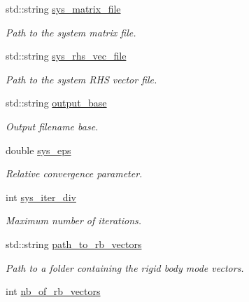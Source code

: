 \begin{DoxyCompactItemize}
\item 
std\+::string \hyperlink{structcarl_1_1libmesh__solve__linear__system__input__params_a2a39165021ba68bc91c857d860539c34}{sys\+\_\+matrix\+\_\+file}
\begin{DoxyCompactList}\small\item\em Path to the system matrix file. \end{DoxyCompactList}\item 
std\+::string \hyperlink{structcarl_1_1libmesh__solve__linear__system__input__params_ab61ffd0ba104883487ed36c6b5ce9e70}{sys\+\_\+rhs\+\_\+vec\+\_\+file}
\begin{DoxyCompactList}\small\item\em Path to the system R\+H\+S vector file. \end{DoxyCompactList}\item 
std\+::string \hyperlink{structcarl_1_1libmesh__solve__linear__system__input__params_a8ef071dca667af6aeafc942ff15df7ad}{output\+\_\+base}
\begin{DoxyCompactList}\small\item\em Output filename base. \end{DoxyCompactList}\item 
double \hyperlink{structcarl_1_1libmesh__solve__linear__system__input__params_aac011ff9dbbc01b0177480e9cdadb5b8}{sys\+\_\+eps}
\begin{DoxyCompactList}\small\item\em Relative convergence parameter. \end{DoxyCompactList}\item 
int \hyperlink{structcarl_1_1libmesh__solve__linear__system__input__params_afead959622d671c5b5ee1200c2e43dad}{sys\+\_\+iter\+\_\+div}
\begin{DoxyCompactList}\small\item\em Maximum number of iterations. \end{DoxyCompactList}\item 
std\+::string \hyperlink{structcarl_1_1libmesh__solve__linear__system__input__params_ab1c0d1c19d1849c0b32e0a1d95d11bff}{path\+\_\+to\+\_\+rb\+\_\+vectors}
\begin{DoxyCompactList}\small\item\em Path to a folder containing the rigid body mode vectors. \end{DoxyCompactList}\item 
int \hyperlink{structcarl_1_1libmesh__solve__linear__system__input__params_abe24bbe9e6a211c17bbb0d2f58d4cd90}{nb\+\_\+of\+\_\+rb\+\_\+vectors}

\end{DoxyCompactItemize}
